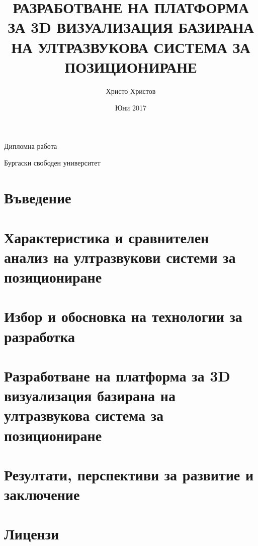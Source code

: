 \documentclass{article}
\title{РАЗРАБОТВАНЕ НА ПЛАТФОРМА ЗА 3D ВИЗУАЛИЗАЦИЯ БАЗИРАНА НА УЛТРАЗВУКОВА СИСТЕМА ЗА ПОЗИЦИОНИРАНЕ}
\author{Христо Христов}
\date{Юни 2017}
\begin{document}
\maketitle

\centerline{\large{Дипломна работа}}
\centerline{\large{Бургаски свободен университет}}

\tableofcontents

\pagebreak
\section{Въведение}



\pagebreak
\section{Характеристика и сравнителен анализ на ултразвукови системи за позициониране}



\pagebreak
\section{Избор и обосновка на технологии за разработка}


\pagebreak
\section{Разработване на платформа за 3D визуализация базирана на ултразвукова система за позициониране}


\pagebreak
\section{Резултати, перспективи за развитие и заключение}


\pagebreak
\section{Лицензи}


\printbibliography
\end{document}
